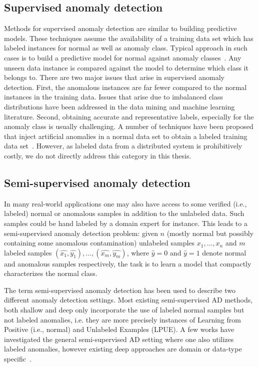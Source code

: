 \subsection{Supervised anomaly detection}
Methods for supervised anomaly detection are similar to building predictive models. These techniques assume the availability of a training data set which has labeled instances for normal as well as anomaly class. Typical approach in such cases is to build a predictive model for normal against anomaly classes~\cite{chandola2009anomaly}. Any unseen data instance is compared against the model to determine which class it belongs to. There are two major issues that arise in supervised anomaly detection. First, the anomalous instances are far fewer compared to the normal instances in the training data. Issues that arise due to imbalanced class distributions have been addressed in the data mining and machine learning literature. Second, obtaining accurate and representative labels, especially for the anomaly class is usually challenging. A number of techniques have been proposed that inject artificial anomalies in a normal data set to obtain a labeled training data set~\cite{theiler2003resampling, steinwart2005classification}. However, as labeled data from a distributed system is prohibitively costly, we do not directly address this category in this thesis.

\subsection{Semi-supervised anomaly detection}
In many real-world applications one may also have access to some verified (i.e., labeled) normal or anomalous samples in addition to the unlabeled data. Such samples could be hand labeled by a domain expert for instance. This leads to a semi-supervised anomaly detection problem: given $n$ (mostly normal but possibly containing some anomalous contamination) unlabeled samples $x_1,\dots, x_n$ and $m$ labeled samples $(\hat{x_1}, \hat{y_1}),\dots,(\hat{x_m}, \hat{y_m})$, where $\hat{y} = 0$ and $\hat{y} = 1$ denote normal and anomalous samples respectively, the task is to learn a model that compactly characterizes the normal class.

The term semi-supervised anomaly detection has been used to describe two different anomaly detection settings. Most existing semi-supervised AD methods, both shallow and deep only incorporate the use of labeled normal samples but not labeled anomalies, i.e. they are more precisely instances of Learning from Positive (i.e., normal) and Unlabeled Examples (LPUE). A few works have investigated the general semi-supervised AD setting where one also utilizes labeled anomalies, however existing deep approaches are domain or data-type specific~\cite{ruff2019deep,chandola2009anomaly}.

